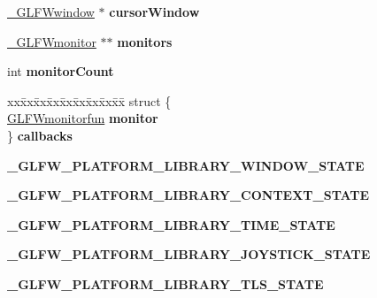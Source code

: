 \begin{DoxyCompactItemize}
\item 
\hypertarget{struct__GLFWlibrary_a17ac24e847a94e0b86474ec823ab9a47}{}\hyperlink{struct__GLFWwindow}{\+\_\+\+G\+L\+F\+Wwindow} $\ast$ {\bfseries cursor\+Window}\label{struct__GLFWlibrary_a17ac24e847a94e0b86474ec823ab9a47}

\item 
\hypertarget{struct__GLFWlibrary_acb84371972f4d704deb0cdc649a1f1da}{}\hyperlink{struct__GLFWmonitor}{\+\_\+\+G\+L\+F\+Wmonitor} $\ast$$\ast$ {\bfseries monitors}\label{struct__GLFWlibrary_acb84371972f4d704deb0cdc649a1f1da}

\item 
\hypertarget{struct__GLFWlibrary_ae3f408467579cb3fb517fcd39fa23568}{}int {\bfseries monitor\+Count}\label{struct__GLFWlibrary_ae3f408467579cb3fb517fcd39fa23568}

\item 
\hypertarget{struct__GLFWlibrary_a83798909063b2c5162327c8f0be83fd6}{}\begin{tabbing}
xx\=xx\=xx\=xx\=xx\=xx\=xx\=xx\=xx\=\kill
struct \{\\
\>\hyperlink{group__monitor_ga8a7ee579a66720f24d656526f3e44c63}{GLFWmonitorfun} {\bfseries monitor}\\
\} {\bfseries callbacks}\label{struct__GLFWlibrary_a83798909063b2c5162327c8f0be83fd6}
\\

\end{tabbing}\item 
\hypertarget{struct__GLFWlibrary_acf3fcb624b8f4cd3c4579bead7111682}{}{\bfseries \+\_\+\+G\+L\+F\+W\+\_\+\+P\+L\+A\+T\+F\+O\+R\+M\+\_\+\+L\+I\+B\+R\+A\+R\+Y\+\_\+\+W\+I\+N\+D\+O\+W\+\_\+\+S\+T\+A\+T\+E}\label{struct__GLFWlibrary_acf3fcb624b8f4cd3c4579bead7111682}

\item 
\hypertarget{struct__GLFWlibrary_a026ab93ed6693b14c3383a3626d8fbc8}{}{\bfseries \+\_\+\+G\+L\+F\+W\+\_\+\+P\+L\+A\+T\+F\+O\+R\+M\+\_\+\+L\+I\+B\+R\+A\+R\+Y\+\_\+\+C\+O\+N\+T\+E\+X\+T\+\_\+\+S\+T\+A\+T\+E}\label{struct__GLFWlibrary_a026ab93ed6693b14c3383a3626d8fbc8}

\item 
\hypertarget{struct__GLFWlibrary_acb631689999659ff3e59b19db89fa9fa}{}{\bfseries \+\_\+\+G\+L\+F\+W\+\_\+\+P\+L\+A\+T\+F\+O\+R\+M\+\_\+\+L\+I\+B\+R\+A\+R\+Y\+\_\+\+T\+I\+M\+E\+\_\+\+S\+T\+A\+T\+E}\label{struct__GLFWlibrary_acb631689999659ff3e59b19db89fa9fa}

\item 
\hypertarget{struct__GLFWlibrary_a6ce06ff388812f6549e0527f350dde27}{}{\bfseries \+\_\+\+G\+L\+F\+W\+\_\+\+P\+L\+A\+T\+F\+O\+R\+M\+\_\+\+L\+I\+B\+R\+A\+R\+Y\+\_\+\+J\+O\+Y\+S\+T\+I\+C\+K\+\_\+\+S\+T\+A\+T\+E}\label{struct__GLFWlibrary_a6ce06ff388812f6549e0527f350dde27}

\item 
\hypertarget{struct__GLFWlibrary_a8ce2ae335765bfdde66133290abf2b1c}{}{\bfseries \+\_\+\+G\+L\+F\+W\+\_\+\+P\+L\+A\+T\+F\+O\+R\+M\+\_\+\+L\+I\+B\+R\+A\+R\+Y\+\_\+\+T\+L\+S\+\_\+\+S\+T\+A\+T\+E}\label{struct__GLFWlibrary_a8ce2ae335765bfdde66133290abf2b1c}

\end{DoxyCompactItemize}



